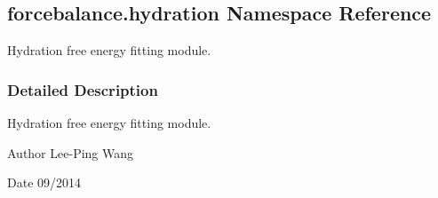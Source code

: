 \hypertarget{namespaceforcebalance_1_1hydration}{}\subsection{forcebalance.\+hydration Namespace Reference}
\label{namespaceforcebalance_1_1hydration}


Hydration free energy fitting module.  




\subsubsection{Detailed Description}
Hydration free energy fitting module. 

\begin{DoxyAuthor}{Author}
Lee-\/\+Ping Wang 
\end{DoxyAuthor}
\begin{DoxyDate}{Date}
09/2014 
\end{DoxyDate}
